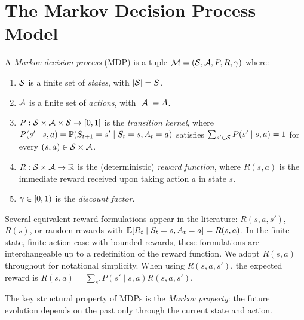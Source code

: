 \documentclass[11pt,a4paper]{article}
\begin{document}

\section{The Markov Decision Process Model}
\label{sec:mdp-model}

\begin{definition}
\label{def:mdp}
A \emph{Markov decision process} (MDP) is a tuple
$\mathcal{M} = (\mathcal{S}, \mathcal{A}, P, R, \gamma)$ where:
\begin{enumerate}[nosep]
    \item $\mathcal{S}$ is a finite set of \emph{states}, with
    $|\mathcal{S}| = S$.
    \item $\mathcal{A}$ is a finite set of \emph{actions}, with
    $|\mathcal{A}| = A$.
    \item $P : \mathcal{S} \times \mathcal{A} \times \mathcal{S} \to [0,1]$ is
    the \emph{transition kernel}, where
    $P(s' \mid s, a) = \mathbb{P}(S_{t+1} = s' \mid S_t = s, A_t = a)$
    satisfies $\sum_{s' \in \mathcal{S}} P(s' \mid s, a) = 1$ for every
    $(s,a) \in \mathcal{S} \times \mathcal{A}$.
    \item $R : \mathcal{S} \times \mathcal{A} \to \mathbb{R}$ is the (deterministic)
    \emph{reward function}, where $R(s,a)$ is the immediate reward
    received upon taking action $a$ in state $s$.
    \item $\gamma \in [0,1)$ is the \emph{discount factor}.
\end{enumerate}
\end{definition}

\begin{remark}
\label{rem:reward-variants}
Several equivalent reward formulations appear in the literature:
$R(s,a,s')$, $R(s)$, or random rewards with
$\mathbb{E}[R_t \mid S_t = s, A_t = a] = R(s,a)$. In the finite-state,
finite-action case with bounded rewards, these formulations are
interchangeable up to a redefinition of the reward function. We adopt
$R(s,a)$ throughout for notational simplicity. When using
$R(s,a,s')$, the expected reward is
$\bar{R}(s,a) = \sum_{s'} P(s' \mid s,a) R(s,a,s')$.
\end{remark}

The key structural property of MDPs is the \emph{Markov property}: the
future evolution depends on the past only through the current state and
action.
\end{document}
